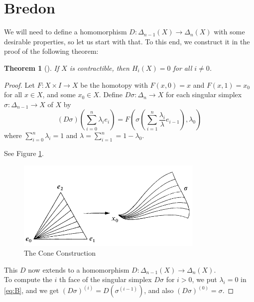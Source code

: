 \documentclass[reqno]{amsart}
\newtheorem{theorem}{Theorem}[section]
\theoremstyle{definition}
\theoremstyle{remark}
\begin{document}
\section{Bredon}


We will need to define a homomorphism
$D \colon \Delta_{n-1}(X) \to \Delta_n(X)$ with some desirable
properties, so let us start with that.
To this end, we construct it in the proof of the following theorem:

\begin{theorem}[]\label{Thm:OOCPPX}
    If $X$ is contractible, then $H_i(X) = 0$ for all
    $i \neq 0$.
\end{theorem}

\begin{proof}
    Let $F \colon X \times I \to X$ be the homotopy with
    $F(x,0) = x$ and $F(x,1) = x_0$ for all $x \in X$, and
    some $x_0 \in X$.
    Define $D \sigma \colon \Delta_n \to X$ for each
    singular simplex $\sigma \colon \Delta_{n-1} \to X$ of
    $X$ by
    \[
        \left( D \sigma \right) 
        \left( \sum_{i=0}^{n} \lambda_i e_i \right) =
        F\left( \sigma \left( \sum_{i=1}^{n}
        \frac{\lambda_i}{\lambda} e_{i-1}\right) , \lambda_0 \right) 
        \tag{B}\label{eq:B}
    \] 
    where $\sum_{i=0}^{n} \lambda_i = 1$ and
    $\lambda = \sum_{i=1}^{n} = 1 - \lambda_0$.

    See Figure \ref{fig:Figures-cone-construction-png}.

    \begin{figure}[htpb]
        \centering
        \includegraphics[width=0.8\textwidth]{Figures/cone-construction.png}
        \caption{The Cone Construction}
        \label{fig:Figures-cone-construction-png}
    \end{figure}

    This $D$ now extends to a homomorphism
    $D \colon \Delta_{n-1}(X) \to \Delta_n(X)$.\\
    \linebreak
    To compute the $i$ th face of the singular simplex
    $D \sigma$ for $i>0$, we put $\lambda_i = 0$ in
    \eqref{eq:B}, and we get
    $(D \sigma)^{(i)} = D \left( \sigma^{(i-1)} \right) $, and
    also
    $(D\sigma)^{(0)} = \sigma$.


\end{proof}
\end{document}

